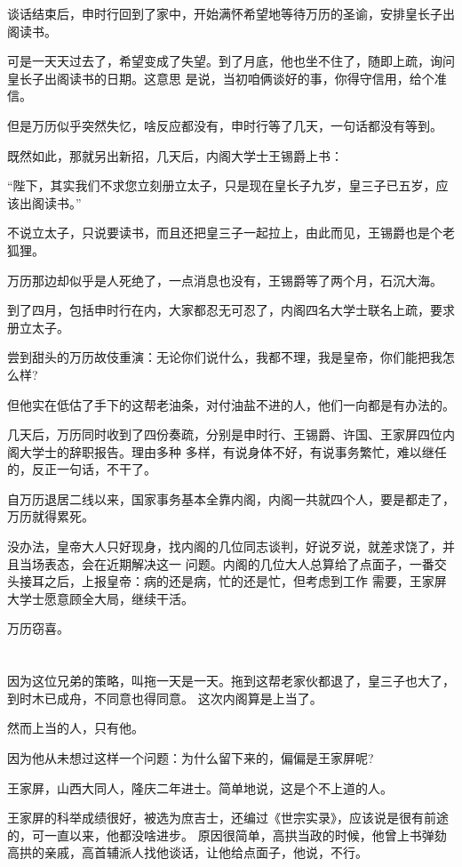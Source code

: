 \documentclass[11pt,a4paper,onecolumn]{article}
\begin{document}
谈话结束后，申时行回到了家中，开始满怀希望地等待万历的圣谕，安排皇长子出阁读书。

可是一天天过去了，希望变成了失望。到了月底，他也坐不住了，随即上疏，询问皇长子出阁读书的日期。这意思
是说，当初咱俩谈好的事，你得守信用，给个准信。

但是万历似乎突然失忆，啥反应都没有，申时行等了几天，一句话都没有等到。

既然如此，那就另出新招，几天后，内阁大学士王锡爵上书：

``陛下，其实我们不求您立刻册立太子，只是现在皇长子九岁，皇三子已五岁，应该出阁读书。''

不说立太子，只说要读书，而且还把皇三子一起拉上，由此而见，王锡爵也是个老狐狸。

万历那边却似乎是人死绝了，一点消息也没有，王锡爵等了两个月，石沉大海。

到了四月，包括申时行在内，大家都忍无可忍了，内阁四名大学士联名上疏，要求册立太子。

尝到甜头的万历故伎重演：无论你们说什么，我都不理，我是皇帝，你们能把我怎么样?

但他实在低估了手下的这帮老油条，对付油盐不进的人，他们一向都是有办法的。

几天后，万历同时收到了四份奏疏，分别是申时行、王锡爵、许国、王家屏四位内阁大学士的辞职报告。理由多种
多样，有说身体不好，有说事务繁忙，难以继任的，反正一句话，不干了。

自万历退居二线以来，国家事务基本全靠内阁，内阁一共就四个人，要是都走了，万历就得累死。

没办法，皇帝大人只好现身，找内阁的几位同志谈判，好说歹说，就差求饶了，并且当场表态，会在近期解决这一
问题。内阁的几位大人总算给了点面子，一番交头接耳之后，上报皇帝：病的还是病，忙的还是忙，但考虑到工作
需要，王家屏大学士愿意顾全大局，继续干活。

万历窃喜。

\section[\thesection]{}

因为这位兄弟的策略，叫拖一天是一天。拖到这帮老家伙都退了，皇三子也大了，到时木已成舟，不同意也得同意。
这次内阁算是上当了。

然而上当的人，只有他。

因为他从未想过这样一个问题：为什么留下来的，偏偏是王家屏呢?

王家屏，山西大同人，隆庆二年进士。简单地说，这是个不上道的人。

王家屏的科举成绩很好，被选为庶吉士，还编过《世宗实录》，应该说是很有前途的，可一直以来，他都没啥进步。
原因很简单，高拱当政的时候，他曾上书弹劾高拱的亲戚，高首辅派人找他谈话，让他给点面子，他说，不行。
\end{document}
